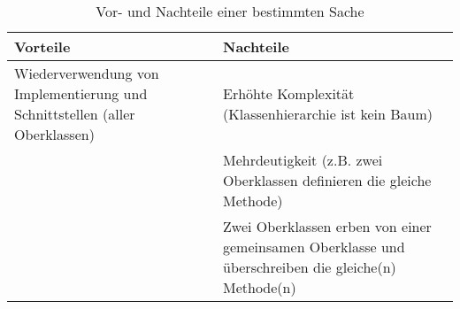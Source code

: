 \documentclass{article}
\begin{document}
\begin{table}[h]
    \centering
    \begin{tabular}{p{5cm}p{5cm}} %
        \toprule
        \textbf{Vorteile} & \textbf{Nachteile} \\
        \midrule
        Wiederverwendung von Implementierung und Schnittstellen (aller Oberklassen) & 
        Erhöhte Komplexität (Klassenhierarchie ist kein Baum)\newline \\
         & Mehrdeutigkeit (z.B. zwei Oberklassen definieren die gleiche Methode) \newline \\
         & Zwei Oberklassen erben von einer gemeinsamen Oberklasse und überschreiben die
         gleiche(n) Methode(n) \newline \\
        \bottomrule
    \end{tabular}
    \caption{Vor- und Nachteile einer bestimmten Sache}
    \label{tab:beispiel}
\end{table}
\end{document}
